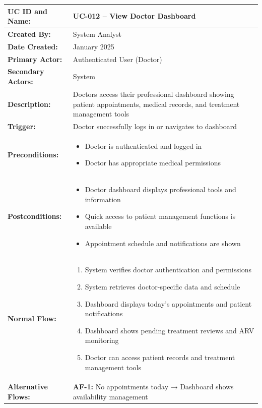 \documentclass[12pt,a4paper]{article}
\begin{document}
\renewcommand{\arraystretch}{1.5}
\begin{longtable}{|p{4.5cm}|p{10.5cm}|}
\hline
\textbf{UC ID and Name:} & UC-012 – View Doctor Dashboard \\
\hline
\textbf{Created By:} & System Analyst \\
\hline
\textbf{Date Created:} & January 2025 \\
\hline
\textbf{Primary Actor:} & Authenticated User (Doctor) \\
\hline
\textbf{Secondary Actors:} & System \\
\hline
\textbf{Description:} & Doctors access their professional dashboard showing patient appointments, medical records, and treatment management tools \\
\hline
\textbf{Trigger:} & Doctor successfully logs in or navigates to dashboard \\
\hline
\textbf{Preconditions:} &
\begin{itemize}
  \item Doctor is authenticated and logged in
  \item Doctor has appropriate medical permissions
\end{itemize} \\
\hline
\textbf{Postconditions:} &
\begin{itemize}
  \item Doctor dashboard displays professional tools and information
  \item Quick access to patient management functions is available
  \item Appointment schedule and notifications are shown
\end{itemize} \\
\hline
\textbf{Normal Flow:} &
\begin{enumerate}
  \item System verifies doctor authentication and permissions
  \item System retrieves doctor-specific data and schedule
  \item Dashboard displays today's appointments and patient notifications
  \item Dashboard shows pending treatment reviews and ARV monitoring
  \item Doctor can access patient records and treatment management tools
\end{enumerate} \\
\hline
\textbf{Alternative Flows:} &
\textbf{AF-1:} No appointments today → Dashboard shows availability management \\

\end{longtable}
\end{document}
